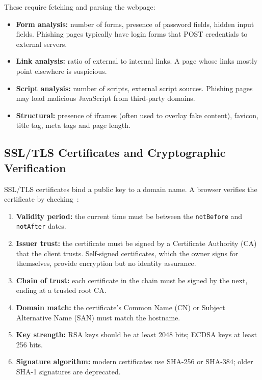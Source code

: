\documentclass[11pt,a4paper]{article}
\begin{document}
These require fetching and parsing the webpage:
\begin{itemize}
  \item \textbf{Form analysis:} number of forms, presence of password fields, hidden input fields. Phishing pages typically have login forms that POST credentials to external servers.
  \item \textbf{Link analysis:} ratio of external to internal links. A page whose links mostly point elsewhere is suspicious.
  \item \textbf{Script analysis:} number of scripts, external script sources. Phishing pages may load malicious JavaScript from third-party domains.
  \item \textbf{Structural:} presence of iframes (often used to overlay fake content), favicon, title tag, meta tags and page length.
\end{itemize}

\subsection{SSL/TLS Certificates and Cryptographic Verification}

SSL/TLS certificates bind a public key to a domain name. A browser verifies the certificate by checking~\cite{rescorla2018,stallings2017}:

\begin{enumerate}
  \item \textbf{Validity period:} the current time must be between the \texttt{notBefore} and \texttt{notAfter} dates.
  \item \textbf{Issuer trust:} the certificate must be signed by a Certificate Authority (CA) that the client trusts. Self-signed certificates, which the owner signs for themselves, provide encryption but no identity assurance.
  \item \textbf{Chain of trust:} each certificate in the chain must be signed by the next, ending at a trusted root CA.
  \item \textbf{Domain match:} the certificate's Common Name (CN) or Subject Alternative Name (SAN) must match the hostname.
  \item \textbf{Key strength:} RSA keys should be at least 2048 bits; ECDSA keys at least 256 bits.
  \item \textbf{Signature algorithm:} modern certificates use SHA-256 or SHA-384; older SHA-1 signatures are deprecated.
\end{enumerate}
\end{document}
